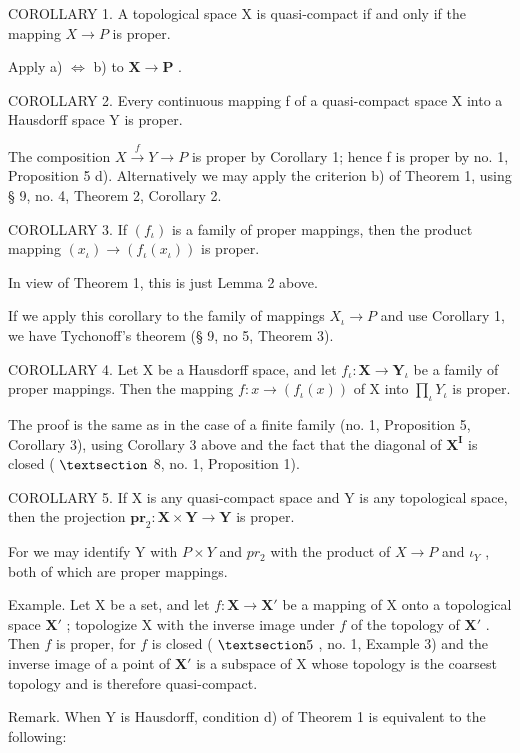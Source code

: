 COROLLARY 1. A topological space X is quasi-compact if and only if the mapping \(X \rightarrow P\) is proper.

Apply a) \(\Longleftrightarrow\) b) to \(\mathbf{X} \to \mathbf{P}\) .

COROLLARY 2. Every continuous mapping f of a quasi-compact space X into a Hausdorff space Y is proper.

The composition \(X \xrightarrow{f} Y \to P\) is proper by Corollary 1; hence f is proper by no. 1, Proposition 5 d). Alternatively we may apply the criterion b) of Theorem 1, using § 9, no. 4, Theorem 2, Corollary 2.

COROLLARY 3. If \((f_{\iota})\) is a family of proper mappings, then the product mapping \((x_{\iota})\to (f_{\iota}(x_{\iota}))\) is proper.

In view of Theorem 1, this is just Lemma 2 above.

If we apply this corollary to the family of mappings \(X_{\iota} \rightarrow P\) and use Corollary 1, we have Tychonoff's theorem (§ 9, no 5, Theorem 3).

COROLLARY 4. Let X be a Hausdorff space, and let \(f_{\iota}: \mathbf{X} \to \mathbf{Y}_{\iota}\) be a family of proper mappings. Then the mapping \(f: x \to (f_{\iota}(x))\) of X into \(\prod_{\iota} Y_{\iota}\) is proper.

The proof is the same as in the case of a finite family (no. 1, Proposition 5, Corollary 3), using Corollary 3 above and the fact that the diagonal of \(\mathbf{X}^{\mathbf{I}}\) is closed ( \(\S\) 8, no. 1, Proposition 1).

COROLLARY 5. If X is any quasi-compact space and Y is any topological space, then the projection \(\mathbf{pr}_2: \mathbf{X} \times \mathbf{Y} \to \mathbf{Y}\) is proper.

For we may identify Y with \(P \times Y\) and \(pr_{2}\) with the product of \(X \rightarrow P\) and \(\iota_{Y}\) , both of which are proper mappings.

Example. Let X be a set, and let \(f: \mathbf{X} \to \mathbf{X}'\) be a mapping of X onto a topological space \(\mathbf{X}'\) ; topologize X with the inverse image under \(f\) of the topology of \(\mathbf{X}'\) . Then \(f\) is proper, for \(f\) is closed ( \(\S 5\) , no. 1, Example 3) and the inverse image of a point of \(\mathbf{X}'\) is a subspace of X whose topology is the coarsest topology and is therefore quasi-compact.

Remark. When Y is Hausdorff, condition d) of Theorem 1 is equivalent to the following:

